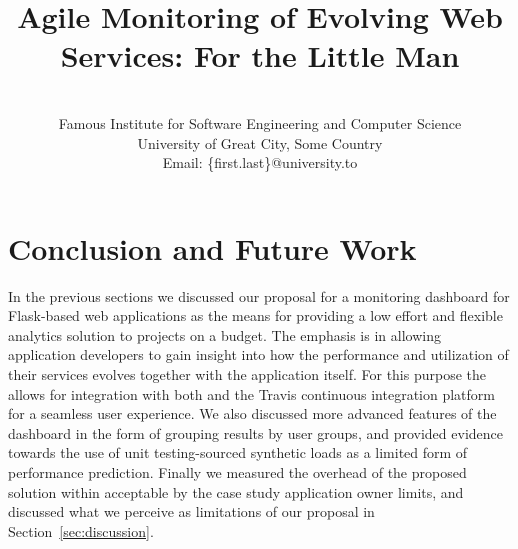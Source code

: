 \documentclass[conference]{IEEEtran}
\begin{document}
	

%
\title{Agile Monitoring of Evolving Web Services: For the Little Man}

\author{
\\
Famous Institute for Software Engineering and Computer Science\\
University of Great City, Some Country\\
Email: \{first.last\}@university.to 
}


\maketitle



















% 






\section{Conclusion and Future Work}
\label{sec:conclusions}

In the previous sections we discussed our proposal for a monitoring dashboard for Flask-based web applications as the means for providing a low effort and flexible analytics solution to projects on a budget. The emphasis is in allowing application developers to gain insight into how the performance and utilization of their services evolves together with the application itself. For this purpose the \tool allows for integration with both \git and the Travis continuous integration platform for a seamless user experience. We also discussed more advanced features of the dashboard in the form of grouping results by user groups, and provided evidence towards the use of unit testing-sourced synthetic loads as a limited form of performance prediction. Finally we measured the overhead of the proposed solution within acceptable by the case study application owner limits, and discussed what we perceive as limitations of our proposal in Section~\ref{sec:discussion}.
\end{document}
